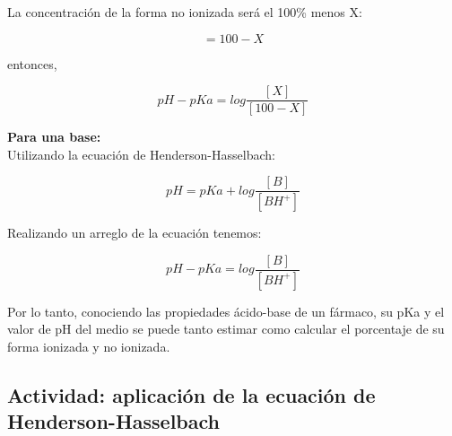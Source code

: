 \documentclass[12pt,a4paper]{article}
\begin{document}
La concentración de la forma no ionizada será el 100\% menos X:

	\begin{equation*}
		[HA] = 100 - X
	\end{equation*}
	
entonces,

	\begin{equation}
		pH - pKa = log \frac{[X]}{[100-X]}
		\label{eqn:Henderson-Hasselbach_3}
	\end{equation}


\textbf{Para una base:}\\

Utilizando la ecuación de Henderson-Hasselbach:

\begin{equation}
	pH = pKa + log \frac{[B]}{[BH^+]}
	\label{eqn:Henderson-Hasselbach_base_1}
\end{equation}

Realizando un arreglo de la ecuación tenemos:

\begin{equation}
	\boxed{pH - pKa = log \frac{[B]}{[BH^+]}}
	\label{eqn:Henderson-Hasselbach_base_2}
\end{equation}


Por lo tanto, conociendo las propiedades ácido-base de un fármaco, su pKa y el valor de pH del medio se puede tanto estimar como calcular el porcentaje de su forma ionizada y no ionizada.

\subsection{Actividad: aplicación de la ecuación de Henderson-Hasselbach}
\end{document}

